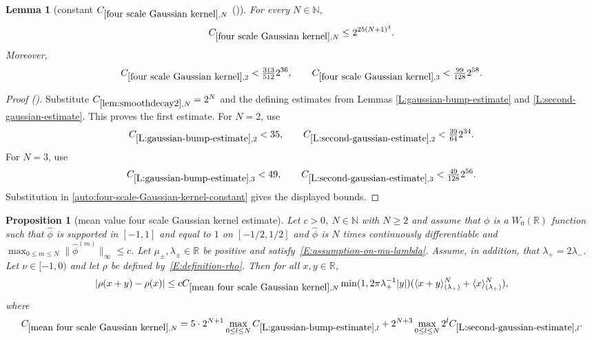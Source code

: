 \documentclass[12pt,reqno]{amsart}
\newcommand{\auto}{{({\tiny\faCar})}}
\theoremstyle{plain}
\newtheorem{lemma}[theorem]{Lemma}
\newtheorem{proposition}[theorem]{Proposition}
\numberwithin{equation}{section}
\theoremstyle{remark}
\newcommand{\using}[1]{}
\newcommand{\R}{{\mathbb R}}
\newcommand{\N}{{\mathbb N}}
\begin{document}
\begin{lemma}[constant $C_{\ref{four scale Gaussian kernel},N}$ \auto]\label{constant four scale Gaussian kernel}\using{lem:smoothdecay2}\using{L:gaussian-bump-estimate}\using{L:second-gaussian-estimate}\using{constant gaussian bump estimate}\using{constant second gaussian estimate}
For every $N\in\N$,
\begin{equation}\label{constant four scale Gaussian kernel bound}
C_{\ref{four scale Gaussian kernel},N}\le2^{25(N+1)^3}.
\end{equation}
Moreover,
\begin{equation}\label{auto:constant-four-scale-Gaussian-kernel-small}
C_{\ref{four scale Gaussian kernel},2}<\tfrac{313}{512}2^{36},
\qquad
C_{\ref{four scale Gaussian kernel},3}<\tfrac{99}{128}2^{58}.
\end{equation}
\end{lemma}
\begin{proof}[Proof \auto]
Substitute $C_{\ref{lem:smoothdecay2},N}=2^N$ and the defining estimates from Lemmas \ref{L:gaussian-bump-estimate} and \ref{L:second-gaussian-estimate}. This proves the first estimate. For $N=2$, use
\[
C_{\ref{L:gaussian-bump-estimate},2}<35,
\qquad
C_{\ref{L:second-gaussian-estimate},2}<\tfrac{39}{64}2^{34}.
\]
For $N=3$, use
\[
C_{\ref{L:gaussian-bump-estimate},3}<49,
\qquad
C_{\ref{L:second-gaussian-estimate},3}<\tfrac{49}{128}2^{56}.
\]
Substitution in \eqref{auto:four-scale-Gaussian-kernel-constant} gives the displayed bounds.
\end{proof}


\begin{proposition}[mean value four scale Gaussian kernel estimate]\label{mean four scale Gaussian kernel}\using{L:gaussian-bump-decomposition}\using{mean value bump estimate 2}\using{L:gaussian-bump-estimate}\using{L:second-gaussian-estimate}
Let $c>0$, $N\in \mathbb N$ with $N\geq 2$ and assume that $\phi$ is a $W_0(\R)$ function such that
$\widehat{\phi}$ is supported in $[-1,1]$ and equal to $1$ on $[-1/2,1/2]$ and $\widehat{\phi}$ is $N$ times continuously differentiable and $\max_{0\leq m \leq N} \|\widehat{\phi}^{(m)}\|_{\infty} \leq c$.
Let $\mu_\pm,\lambda_\pm\in\mathbb R$ be positive and satisfy~\eqref{E:assumption-on-mu-lambda}. Assume, in addition, that $\lambda_{+}=2\lambda_{-}$.
Let $\nu\in [-1,0)$ and let $\rho$ be defined by~\eqref{E:definition-rho}.
Then for all $x,y \in\mathbb{R}$,
\begin{equation}\label{E:mean-value}
|\rho(x+y)-\rho(x)| \le c C_{\ref{mean four scale Gaussian kernel},N} \min(1,2\pi \lambda_{+}^{-1}|y|) (\langle x+y\rangle^N_{(\lambda_+)}+
\langle x\rangle^N_{(\lambda_+)}),
\end{equation}
where
\begin{equation}\label{auto:mean-four-scale-Gaussian-constant} C_{\ref{mean four scale Gaussian kernel},N} =  5\cdot 2^{N+1}\max_{0\leq l \leq N} C_{\ref{L:gaussian-bump-estimate},l} +2^{N+3}\max_{0\leq l \leq N} 2^lC_{\ref{L:second-gaussian-estimate},l}.\end{equation}


\end{proposition}
\end{document}
